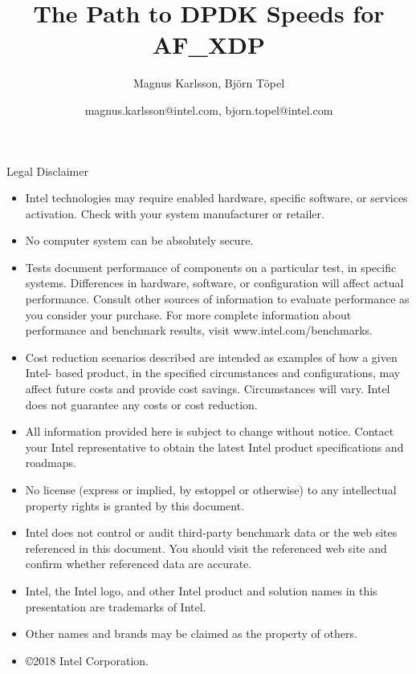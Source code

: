 \documentclass[aspectratio=169]{beamer}
\title{The Path to DPDK Speeds for AF\_XDP}
\author{Magnus Karlsson, Björn Töpel}
\date{magnus.karlsson@intel.com, bjorn.topel@intel.com}
\institute{Linux Plumbers Conference, Vancouver, 2018}
\begin{document}
  \maketitle

  \begin{frame}{Legal Disclaimer}
  \tiny
  \begin{itemize}
  \item Intel technologies may require enabled hardware, specific software, or services activation. Check with your system manufacturer or retailer.
  \item No computer system can be absolutely secure.
  \item Tests document performance of components on a particular test, in specific systems. Differences in hardware, software, or configuration will affect actual performance. Consult other sources of information to evaluate performance as you consider your purchase. For more complete information about performance and benchmark results, visit www.intel.com/benchmarks.
  \item Cost reduction scenarios described are intended as examples of how a given Intel- based product, in the specified circumstances and configurations, may affect future costs and provide cost savings. Circumstances will vary. Intel does not guarantee any costs or cost reduction.
  \item All information provided here is subject to change without notice. Contact your Intel representative to obtain the latest Intel product specifications and roadmaps.
  \item No license (express or implied, by estoppel or otherwise) to any intellectual property rights is granted by this document.
  \item Intel does not control or audit third-party benchmark data or the web sites referenced in this document. You should visit the referenced web site and confirm whether referenced data are accurate.
  \item Intel, the Intel logo, and other Intel product and solution names in this presentation are trademarks of Intel.
  \item Other names and brands may be claimed as the property of others.
  \item \copyright 2018 Intel Corporation.
  \end{itemize}
  \end{frame}
\end{document}
